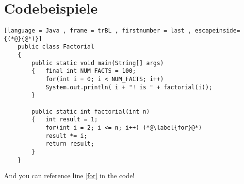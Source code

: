 \chapter{Codebeispiele}
\label{cha:codebeispiele}

\begin{lstlisting}[language = Java , frame = trBL , firstnumber = last , escapeinside={(*@}{@*)}]
	public class Factorial
	{
		public static void main(String[] args)
		{   final int NUM_FACTS = 100;
			for(int i = 0; i < NUM_FACTS; i++)
			System.out.println( i + "! is " + factorial(i));
		}
		
		public static int factorial(int n)
		{   int result = 1;
			for(int i = 2; i <= n; i++) (*@\label{for}@*)
			result *= i;
			return result;
		}
	}
\end{lstlisting}

And you can reference line \ref{for} in the code!